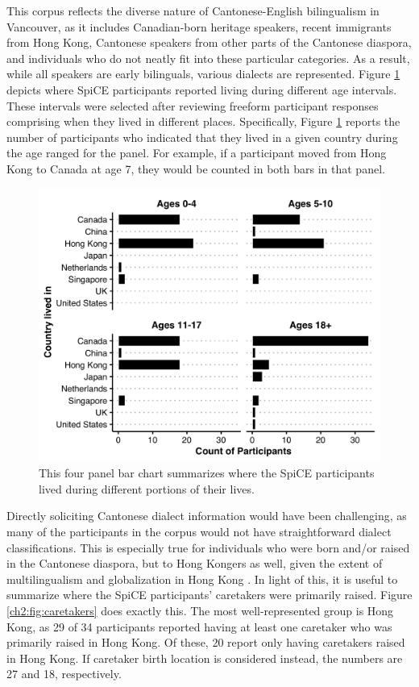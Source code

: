 This corpus reflects the diverse nature of Cantonese-English bilingualism in Vancouver, as it includes Canadian-born heritage speakers, recent immigrants from Hong Kong, Cantonese speakers from other parts of the Cantonese diaspora, and individuals who do not neatly fit into these particular categories. As a result, while all speakers are early bilinguals, various dialects are represented. Figure \ref{ch2:fig:placeslived} depicts where SpiCE participants reported living during different age intervals. These intervals were selected after reviewing freeform participant responses comprising when they lived in different places. Specifically, Figure \ref{ch2:fig:placeslived} reports the number of participants who indicated that they lived in a given country during the age ranged for the panel. For example, if a participant moved from Hong Kong to Canada at age 7, they would be counted in both bars in that panel. 

\begin{figure}[!htbp]
  \begin{center}
  \includegraphics[width=4.9in]{figures/ch2_placeslived_5in.png} 
  \caption{This four panel bar chart summarizes where the SpiCE participants lived during different portions of their lives.}
  \label{ch2:fig:placeslived}
  \end{center}
\end{figure}

Directly soliciting Cantonese dialect information would have been challenging, as many of the participants in the corpus would not have straightforward dialect classifications. This is especially true for individuals who were born and/or raised in the Cantonese diaspora, but to Hong Kongers as well, given the extent of multilingualism and globalization in Hong Kong \citep{bolton_2020_societal}. In light of this, it is useful to summarize where the SpiCE participants' caretakers were primarily raised. Figure \ref{ch2:fig:caretakers} does exactly this. The most well-represented group is Hong Kong, as 29 of 34 participants reported having at least one caretaker who was primarily raised in Hong Kong. Of these, 20 report only having caretakers raised in Hong Kong. If caretaker birth location is considered instead, the numbers are 27 and 18, respectively. 

